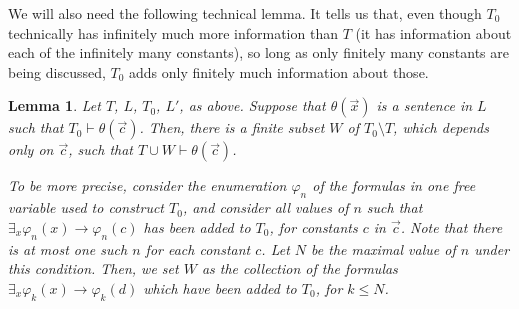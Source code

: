 \documentclass{article}
\newtheorem{lemma}{Lemma}
\theoremstyle{nonumberplain}
\begin{document}
We will also need the following technical lemma. It tells us that, even though $T_0$ technically has infinitely much more information than $T$ (it has information about each of the infinitely many constants), so long as only finitely many constants are being discussed, $T_0$ adds only finitely much information about those.

\begin{lemma}\label{lemma:finitehypotheses}
Let $T$, $L$, $T_0$, $L'$, as above. Suppose that $\theta(\vec x)$ is a sentence in $L$ such that $T_0 \vdash \theta(\vec c)$. Then, there is a finite subset $W$ of $T_0 \setminus T$, which depends only on $\vec c$, such that $T \cup W \vdash \theta(\vec c)$.

To be more precise, consider the enumeration $\varphi_n$ of the formulas in one free variable used to construct $T_0$, and consider all values of $n$ such that $\exists_x \varphi_n(x) \rightarrow \varphi_n(c)$ has been added to $T_0$, for constants $c$ in $\vec c$. Note that there is at most one such $n$ for each constant $c$. Let $N$ be the maximal value of $n$ under this condition. Then, we set $W$ as the collection of the formulas $\exists_x \varphi_k(x) \rightarrow \varphi_k(d)$ which have been added to $T_0$, for $k \leq N$.
\end{lemma}
\end{document}
